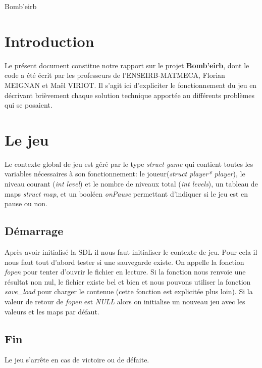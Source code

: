 \documentclass[12pt,a4paper]{article} %
\begin{document}

\begin{center}
  \huge{Bomb'eirb}
\end{center}

\section{Introduction}

Le présent document constitue notre rapport sur le projet \textbf{Bomb'eirb},
 dont le code a été écrit par les professeurs de l'ENSEIRB-MATMECA, Florian 
 MEIGNAN et Maël VIRIOT. Il s'agit ici d'expliciter le fonctionnement du 
 jeu en décrivant brièvement chaque solution technique apportée au 
 différents problèmes qui se posaient.

\section{Le jeu}

Le contexte global de jeu est géré par le type \emph{struct game} qui contient toutes les variables nécessaires à son fonctionnement: le joueur(\emph{struct player* player}), le niveau courant (\emph{int level}) et le nombre de niveaux total (\emph{int levels}), un tableau de  maps \emph{struct map}, et un booléen \emph{onPause} permettant d'indiquer si le jeu est en pause ou non.

\subsection{Démarrage}

Après avoir initialisé la SDL il nous faut initialiser le contexte de jeu. Pour cela il nous faut tout d'abord tester si une sauvegarde existe. On appelle la fonction \emph{fopen} pour tenter d'ouvrir le fichier en lecture. Si la fonction nous renvoie une résultat non nul, le fichier existe bel et bien et nous pouvons utiliser la fonction \emph{save\_load}
pour charger le contenue (cette fonction est explicitée plus loin). Si la valeur de retour de \emph{fopen} est \emph{NULL} alors on initialise un nouveau jeu avec les valeurs et les maps par défaut.

\subsection{Fin}

Le jeu s'arrête en cas de victoire ou de défaite. 
\end{document}
